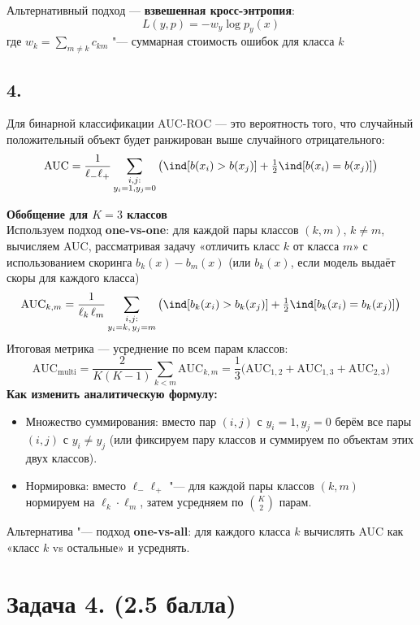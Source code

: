 \documentclass[12pt,a4paper]{article}
\begin{document}
Альтернативный подход --- \textbf{взвешенная кросс-энтропия}:
\[
L(y, p) = -w_y \log p_y(x)
\]
где $w_k = \sum_{m \ne k} c_{km}$ "--- суммарная стоимость ошибок
для класса $k$\\[1mm]

\subsection*{4.}

Для бинарной классификации AUC-ROC --- это вероятность того, что случайный
положительный объект будет ранжирован выше случайного отрицательного:
\[
\text{AUC} = \frac{1}{\ell_-\ell_+}\sum_{\substack{i,j:\\y_i=1,y_j=0}}
\left(\ind[b(x_i)>b(x_j)] + \tfrac{1}{2}\ind[b(x_i)=b(x_j)]\right)
\]

\textbf{Обобщение для $K=3$ классов}\\[1mm]
Используем подход \textbf{one-vs-one}: для каждой пары классов
$(k, m)$, $k \ne m$, вычисляем AUC, рассматривая задачу «отличить
класс $k$ от класса $m$» с использованием скоринга $b_k(x) - b_m(x)$
(или $b_k(x)$, если модель выдаёт скоры для каждого класса)
\[
\text{AUC}_{k,m} = \frac{1}{\ell_k\,\ell_m}
\sum_{\substack{i,j:\\y_i=k,\,y_j=m}}
\left(\ind [b_k(x_i) > b_k(x_j)] +
\tfrac{1}{2}\ind [b_k(x_i) = b_k(x_j)]\right)
\]
Итоговая метрика --- усреднение по всем парам классов:
\[
\text{AUC}_{\text{multi}} = \frac{2}{K(K-1)}
\sum_{k<m} \text{AUC}_{k,m} =
\frac{1}{3}\bigl(\text{AUC}_{1,2} + \text{AUC}_{1,3} + \text{AUC}_{2,3}\bigr)
\]
\textbf{Как изменить аналитическую формулу:}
\begin{itemize}
    \item Множество суммирования: вместо пар $(i,j)$ с $y_i=1, y_j=0$
    берём все пары $(i,j)$ с $y_i \ne y_j$ (или фиксируем пару классов
    и суммируем по объектам этих двух классов).
    \item Нормировка: вместо $\ell_-\ell_+$ "--- для каждой пары классов
    $(k,m)$ нормируем на $\ell_k\cdot\ell_m$, затем усредняем по
    $\binom{K}{2}$ парам.
\end{itemize}

Альтернатива "--- подход \textbf{one-vs-all}: для каждого класса $k$
вычислять AUC как «класс $k$ vs остальные» и усреднять.


\section*{Задача 4. (2.5 балла)}
\end{document}
